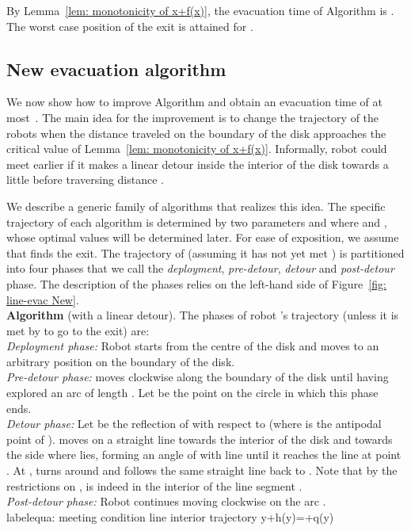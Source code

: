 \documentclass[
final
]{dmtcs-episciences}
\theoremstyle{definition}
\begin{document}
By Lemma~\ref{lem: monotonicity of x+f(x)}, the evacuation time of Algorithm  is . The worst case position of the exit is attained for . 





\subsection{New evacuation algorithm \texorpdfstring{}{Lg}}


We now show how to improve Algorithm  and obtain an evacuation time of at most~.
The main idea for the improvement is to change the trajectory of the robots when the distance traveled on the boundary of the disk approaches the critical value  of Lemma~\ref{lem: monotonicity of x+f(x)}. Informally, 
robot  could meet  earlier if it makes a linear detour inside the interior of 
the disk towards  a little before traversing distance . 

We describe a generic family of algorithms that realizes this idea. The specific
trajectory of each algorithm is determined by two parameters  and   where  and , whose optimal values will be determined later. 
For ease of exposition, we assume that  finds the exit. The trajectory of  (assuming it has not yet met ) is  
partitioned into four phases that we call the \textit{deployment}, \textit{pre-detour}, \textit{detour} and \textit{post-detour} phase. 
The description of the phases relies on the left-hand side of Figure~\ref{fig: line-evac New}.\\

\noindent
{\bf Algorithm }(with a linear detour).  
The phases of robot 's trajectory (unless it is met by  to go to the exit) are: \\  \textit{Deployment phase:} 
Robot  starts from the centre  of the disk and moves to an arbitrary position  on the boundary of the disk. \\  \textit{Pre-detour phase:} 
 moves clockwise along the boundary of the disk until having explored an arc of length . 
Let  be the point on the circle in which this phase ends.\\
 \textit{Detour phase:}
Let  be the reflection of  with respect to  (where  is the antipodal point of ). 
 moves on a straight line towards the interior of the disk and towards the side where  lies, 
forming an angle of  with line  until it reaches the line  at point . 
At ,  turns around and follows the same straight line back to . 
Note that by the restrictions on ,  is indeed in the interior of the line segment . \\
 \textit{Post-detour phase:}
Robot  continues moving clockwise on the arc . \\label{equa: meeting condition line interior trajectory}
y+h(y)=\chi+q(y)
\end{document}

